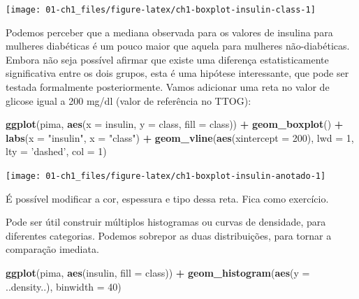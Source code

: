 \documentclass[
]{book}
\newenvironment{Shaded}{\begin{snugshade}}{\end{snugshade}}
\newcommand{\DataTypeTok}[1]{\textcolor[rgb]{0.13,0.29,0.53}{#1}}
\newcommand{\DecValTok}[1]{\textcolor[rgb]{0.00,0.00,0.81}{#1}}
\newcommand{\KeywordTok}[1]{\textcolor[rgb]{0.13,0.29,0.53}{\textbf{#1}}}
\newcommand{\NormalTok}[1]{#1}
\newcommand{\OperatorTok}[1]{\textcolor[rgb]{0.81,0.36,0.00}{\textbf{#1}}}
\newcommand{\StringTok}[1]{\textcolor[rgb]{0.31,0.60,0.02}{#1}}
\theoremstyle{definition}
\theoremstyle{definition}
\theoremstyle{definition}
\theoremstyle{remark}
\begin{document}
\texttt{[image: 01-ch1\_files/figure-latex/ch1-boxplot-insulin-class-1]}

Podemos perceber que a mediana observada para os valores de insulina para mulheres diabéticas é um pouco maior que aquela para mulheres não-diabéticas. Embora não seja possível afirmar que existe uma diferença estatisticamente significativa entre os dois grupos, esta é uma hipótese interessante, que pode ser testada formalmente posteriormente. Vamos adicionar uma reta no valor de glicose igual a 200 mg/dl (valor de referência no TTOG):

\begin{Shaded}
\begin{Highlighting}[]
\KeywordTok{ggplot}\NormalTok{(pima, }\KeywordTok{aes}\NormalTok{(}\DataTypeTok{x =}\NormalTok{ insulin, }\DataTypeTok{y =}\NormalTok{ class, }\DataTypeTok{fill =}\NormalTok{ class)) }\OperatorTok{+}
\StringTok{  }\KeywordTok{geom_boxplot}\NormalTok{() }\OperatorTok{+}
\StringTok{  }\KeywordTok{labs}\NormalTok{(}\DataTypeTok{x =} \StringTok{"insulin"}\NormalTok{, }\DataTypeTok{x =} \StringTok{"class"}\NormalTok{) }\OperatorTok{+}
\StringTok{  }\KeywordTok{geom_vline}\NormalTok{(}\KeywordTok{aes}\NormalTok{(}\DataTypeTok{xintercept =} \DecValTok{200}\NormalTok{), }\DataTypeTok{lwd =} \DecValTok{1}\NormalTok{, }\DataTypeTok{lty =} \StringTok{'dashed'}\NormalTok{, }\DataTypeTok{col =} \DecValTok{1}\NormalTok{)}
\end{Highlighting}
\end{Shaded}

\texttt{[image: 01-ch1\_files/figure-latex/ch1-boxplot-insulin-anotado-1]}

É possível modificar a cor, espessura e tipo dessa reta. Fica como exercício.

Pode ser útil construir múltiplos histogramas ou curvas de densidade, para diferentes categorias. Podemos sobrepor as duas distribuições, para tornar a comparação imediata.

\begin{Shaded}
\begin{Highlighting}[]
\KeywordTok{ggplot}\NormalTok{(pima, }\KeywordTok{aes}\NormalTok{(insulin, }\DataTypeTok{fill =}\NormalTok{ class)) }\OperatorTok{+}\StringTok{ }
\StringTok{  }\KeywordTok{geom_histogram}\NormalTok{(}\KeywordTok{aes}\NormalTok{(}\DataTypeTok{y =}\NormalTok{ ..density..), }\DataTypeTok{binwidth =} \DecValTok{40}\NormalTok{) }
\end{Highlighting}
\end{Shaded}
\end{document}
